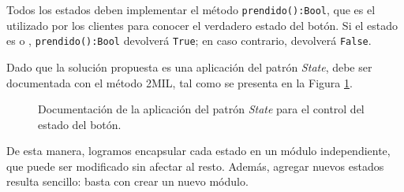 Todos los estados deben implementar el método \verb|prendido():Bool|, que es el utilizado por los clientes para conocer el verdadero estado del botón. Si el estado es \On o \OffWait, \verb|prendido():Bool| devolverá \verb|True|; en caso contrario, devolverá \verb|False|.

Dado que la solución propuesta es una aplicación del patrón \textit{State}, debe ser documentada con el método 2MIL, tal como se presenta en la Figura \ref{docDeboun}.

\begin{figure}
\caption{Documentación de la aplicación del patrón \textit{State} para el control del estado del botón.}
\label{docDeboun}
\end{figure}


De esta manera, logramos encapsular cada estado en un módulo independiente, que puede ser modificado sin afectar al resto. Además, agregar nuevos estados resulta sencillo: basta con crear un nuevo módulo.



